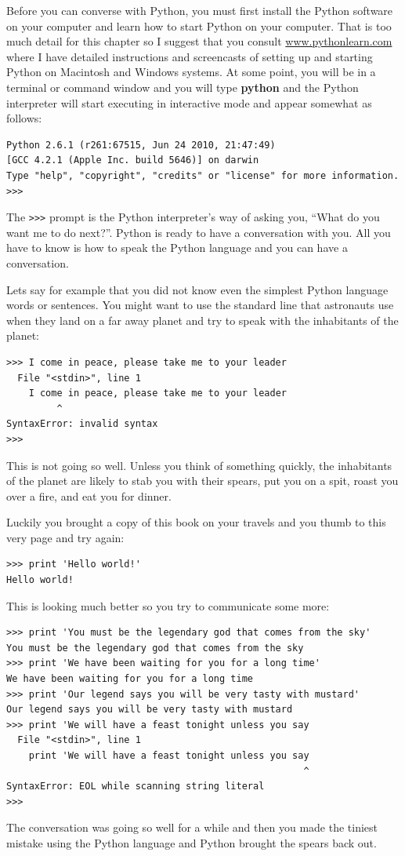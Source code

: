 Before you can converse with Python, you must first install the Python
software on your computer and learn how to start Python on your 
computer.  That is too much detail for this chapter so I suggest
that you consult \url{www.pythonlearn.com} where I have detailed
instructions and screencasts of setting up and starting Python 
on Macintosh and Windows systems.  At some point, you will be in 
a terminal or command window and you will type {\bf python} and 
the Python interpreter will start executing in interactive mode
and appear somewhat as follows:

\beforeverb
\begin{verbatim}
Python 2.6.1 (r261:67515, Jun 24 2010, 21:47:49) 
[GCC 4.2.1 (Apple Inc. build 5646)] on darwin
Type "help", "copyright", "credits" or "license" for more information.
>>> 
\end{verbatim}
\afterverb
%
The {\tt >>>} prompt is the Python interpreter's way of asking you, ``What
do you want me to do next?''.  Python is ready to have a conversation with
you.  All you have to know is how to speak the Python language and you 
can have a conversation.

Lets say for example that you did not know even the simplest Python language
words or sentences. You might want to use the standard line that astronauts 
use when they land on a far away planet and try to speak with the inhabitants
of the planet:

\beforeverb
\begin{verbatim}
>>> I come in peace, please take me to your leader
  File "<stdin>", line 1
    I come in peace, please take me to your leader
         ^
SyntaxError: invalid syntax
>>> 
\end{verbatim}
\afterverb
%
This is not going so well.  Unless you think of something quickly,
the inhabitants of the planet are likely to stab you with their spears, 
put you on a spit, roast you over a fire, and eat you for dinner.

Luckily you brought a copy of this book on your travels and you thumb to
this very page and try again:

\beforeverb
\begin{verbatim}
>>> print 'Hello world!'
Hello world!
\end{verbatim}
\afterverb
%
This is looking much better so you try to communicate some
more:

\beforeverb
\begin{verbatim}
>>> print 'You must be the legendary god that comes from the sky'
You must be the legendary god that comes from the sky
>>> print 'We have been waiting for you for a long time'
We have been waiting for you for a long time
>>> print 'Our legend says you will be very tasty with mustard'
Our legend says you will be very tasty with mustard
>>> print 'We will have a feast tonight unless you say
  File "<stdin>", line 1
    print 'We will have a feast tonight unless you say
                                                     ^
SyntaxError: EOL while scanning string literal
>>> 
\end{verbatim}
\afterverb
%
The conversation was going so well for a while and then you
made the tiniest mistake using the Python language and Python 
brought the spears back out.

